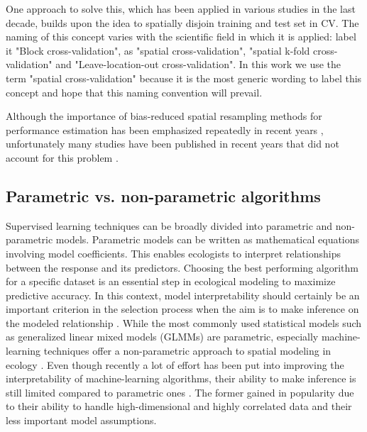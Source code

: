 \documentclass[review]{elsarticle}
\begin{document}
One approach to solve this, which has been applied in various studies in the last decade, builds upon the idea to spatially disjoin training and test set in \ac{CV}.
The naming of this concept varies with the scientific field in which it is applied: \cite{Burman1994, Roberts2017, Shao1993} label it "Block cross-validation", \cite{Brenning2005} as "spatial cross-validation", \cite{pohjankukkaEstimatingPredictionPerformance2017} "spatial k-fold cross-validation" and \cite{Meyer2018} "Leave-location-out cross-validation".
In this work we use the term "spatial cross-validation" because it is the most generic wording to label this concept and hope that this naming convention will prevail.

Although the importance of bias-reduced spatial resampling methods for performance estimation has been emphasized repeatedly in recent years \citep{Geiss2017, Meyer2018, Wenger2012}, unfortunately many studies have been published in recent years that did not account for this problem \citep{Bui2015, Pourghasemi2018, Smolinski2016, Wollan2008, Youssef2015}.

\subsection{Parametric vs. non-parametric algorithms}
Supervised learning techniques can be broadly divided into parametric and non-parametric models.
Parametric models can be written as mathematical equations involving model coefficients.
This enables ecologists to interpret relationships between the response and its predictors.
Choosing the best performing algorithm for a specific dataset is an essential step in ecological modeling to maximize predictive accuracy.
In this context, model interpretability should certainly be an important criterion in the selection process when the aim is to make inference on the modeled relationship \citep{johnsonModelSelectionEcology2004}.
While the most commonly used statistical models such as generalized linear mixed models (GLMMs) are parametric, especially machine-learning techniques offer a non-parametric approach to spatial modeling in ecology \citep{deathBoostedTreesEcological2007}.
Even though recently a lot of effort has been put into improving the interpretability of machine-learning algorithms, their ability to make inference is still limited compared to parametric ones \citep{adlerAuditingBlackboxModels2018, heneliusPeekBlackBox2014}. 
The former gained in popularity due to their ability to handle high-dimensional and highly correlated data and their less important model assumptions.
\end{document}
